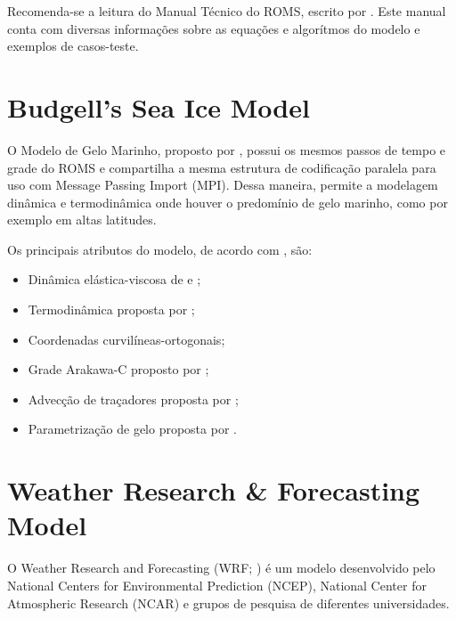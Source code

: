 \noindent Recomenda-se a leitura do Manual Técnico do ROMS, escrito por \textcite{hedstrom2018}. Este manual conta com diversas 
          informações sobre as equações e algorítmos do modelo e exemplos de casos-teste. 



\section{Budgell's Sea Ice Model}
\bigskip

\noindent O Modelo de Gelo Marinho, proposto por \textcite{Budgell2005}, possui os mesmos passos de tempo e grade do ROMS e 
          compartilha a mesma estrutura de codificação paralela para uso com Message Passing Import (MPI). Dessa maneira, 
          permite a modelagem dinâmica e termodinâmica onde houver o predomínio de gelo marinho, como por exemplo em altas latitudes. 
\bigskip

\noindent Os principais atributos do modelo, de acordo com \textcite{hedstrom2018}, são:
\bigskip
\begin{itemize}
    \item Dinâmica elástica-viscosa de \textcite{Hunke1997} e \textcite{Hunke2001};
    \item Termodinâmica proposta por \textcite{Mellor1989};
    \item Coordenadas curvilíneas-ortogonais;
    \item Grade Arakawa-C proposto  por \textcite{Arakawa1977};
    \item Advecção de traçadores proposta por \textcite{Smolarkiewicz1990};
    \item Parametrização de gelo proposta por \textcite{Lemieux2015}.
\end{itemize}
\bigskip



\section{Weather Research \& Forecasting Model}
\bigskip

\noindent O Weather Research and Forecasting (WRF; \cite{Skamarock2008}) é um modelo desenvolvido pelo National Centers for 
          Environmental Prediction (NCEP), National Center for Atmospheric Research (NCAR) e grupos de pesquisa de diferentes
          universidades.
\bigskip

